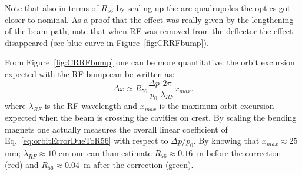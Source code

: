 %
Note that also in terms of $R_{56}$ by scaling up the arc quadrupoles the optics got closer to nominal.
As a proof that the effect was really given by the lengthening of the beam path, 
note that when RF was removed from the deflector the effect disappeared (see blue curve in Figure~\ref{fig:CRRFbump}).

From Figure~\ref{fig:CRRFbump} one can be more quantitative: the orbit excursion expected with the RF bump can be written as:
\begin{equation}
\Delta x \approx R_{56} \frac{\Delta p}{p_0} \frac{2 \pi}{\lambda_{RF}} x_{max}.
\label{eq:orbitErrorDueToR56}
\end{equation}
%
where $\lambda_{RF}$ is the RF wavelength and $x_{max}$ is the maximum orbit excursion expected when 
the beam is crossing the cavities on crest. 
By scaling the bending magnets one actually measures the overall linear coefficient of 
Eq.~\ref{eq:orbitErrorDueToR56} with respect to 
$\Delta p/p_0$.
By knowing that $x_{max}\approx 25$ mm; $\lambda_{RF}\approx 10$ cm one can than estimate 
$R_{56} \approx 0.16$~m before the correction (red) and $R_{56} \approx 0.04$~m after the correction (green).




